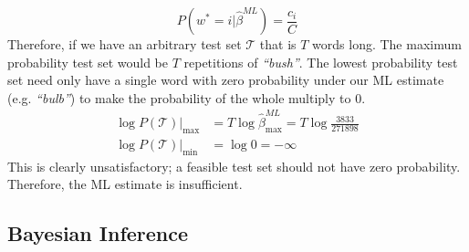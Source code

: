 \documentclass[]{article}
\newcommand{\betaml}{\hat{\beta}^{ML}}
\begin{document}
%
\begin{equation}
	P(w^* = i | \betaml) = \frac{c_i}{C}
	\label{eqn:ml-est}
\end{equation}
%
Therefore, if we have an arbitrary test set $\mathcal{T}$ that is $T$ words long. The maximum probability test set would be $T$ repetitions of \textit{``bush''}. The lowest probability test set need only have a single word with zero probability under our ML estimate (e.g. \textit{``bulb''}) to make the probability of the whole multiply to 0.
%
\begin{align}
	\log P(\mathcal{T}) |_{\max} &= T \log \betaml_{\max} = T \log \frac{3833}{271898} \\
	\log P(\mathcal{T}) |_{\min} &= \log 0 = - \infty
\end{align}
%
This is clearly unsatisfactory; a feasible test set should not have zero probability. Therefore, the ML estimate is insufficient.
 
 \clearpage
\subsection{Bayesian Inference}
\end{document}
